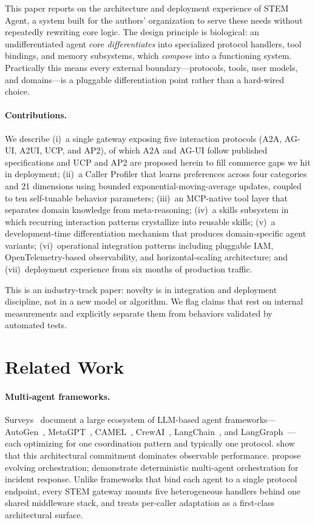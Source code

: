 \documentclass[11pt]{article}
\begin{document}
This paper reports on the architecture and deployment experience of STEM Agent, a system built for the authors' organization to serve these needs without repeatedly rewriting core logic. The design principle is biological: an undifferentiated agent core \emph{differentiates} into specialized protocol handlers, tool bindings, and memory subsystems, which \emph{compose} into a functioning system. Practically this means every external boundary---protocols, tools, user models, and domains---is a pluggable differentiation point rather than a hard-wired choice.

\paragraph{Contributions.} We describe (i)~a single gateway exposing five interaction protocols (A2A, AG-UI, A2UI, UCP, and AP2), of which A2A and AG-UI follow published specifications and UCP and AP2 are proposed herein to fill commerce gaps we hit in deployment; (ii)~a Caller Profiler that learns preferences across four categories and 21 dimensions using bounded exponential-moving-average updates, coupled to ten self-tunable behavior parameters; (iii)~an MCP-native tool layer that separates domain knowledge from meta-reasoning; (iv)~a skills subsystem in which recurring interaction patterns crystallize into reusable skills; (v)~a development-time differentiation mechanism that produces domain-specific agent variants; (vi)~operational integration patterns including pluggable IAM, OpenTelemetry-based observability, and horizontal-scaling architecture; and (vii)~deployment experience from six months of production traffic.

This is an industry-track paper: novelty is in integration and deployment discipline, not in a new model or algorithm. We flag claims that rest on internal measurements and explicitly separate them from behaviors validated by automated tests.

\section{Related Work}
\label{sec:related}

\paragraph{Multi-agent frameworks.}
Surveys~\citep{tran2025multiagent, ferrag2025agents} document a large ecosystem of LLM-based agent frameworks---AutoGen~\citep{wu2023autogen}, MetaGPT~\citep{hong2023metagpt}, CAMEL~\citep{li2023camel}, CrewAI~\citep{crewai2023}, LangChain~\citep{chase2022langchain}, and LangGraph~\citep{langgraph2024}---each optimizing for one coordination pattern and typically one protocol. \citet{orogat2026mafbench} show that this architectural commitment dominates observable performance. \citet{dang2025evolving} propose evolving orchestration; \citet{drammeh2025orchestration} demonstrate deterministic multi-agent orchestration for incident response. Unlike frameworks that bind each agent to a single protocol endpoint, every STEM gateway mounts five heterogeneous handlers behind one shared middleware stack, and treats per-caller adaptation as a first-class architectural surface.
\end{document}
